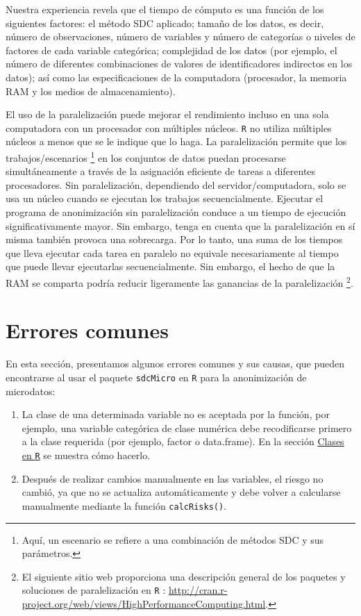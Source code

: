 \documentclass[]{book}
\theoremstyle{definition}
\theoremstyle{definition}
\theoremstyle{definition}
\theoremstyle{definition}
\theoremstyle{remark}
\begin{document}
Nuestra experiencia revela que el tiempo de cómputo es una función de los siguientes factores: el método SDC aplicado; tamaño de los datos, es decir, número de observaciones, número de variables y número de categorías o niveles de factores de cada variable categórica; complejidad de los datos (por ejemplo, el número de diferentes combinaciones de valores de identificadores indirectos en los datos); así como las especificaciones de la computadora (procesador, la memoria RAM y los medios de almacenamiento).

El uso de la paralelización puede mejorar el rendimiento incluso en una sola computadora con un procesador con múltiples núcleos. \texttt{R} no utiliza múltiples núcleos a menos que se le indique que lo haga. La paralelización permite que los trabajos/escenarios \footnote{Aquí, un escenario se refiere a una combinación de métodos SDC y sus parámetros.} en los conjuntos de datos puedan procesarse simultáneamente a través de la asignación eficiente de tareas a diferentes procesadores. Sin paralelización, dependiendo del servidor/computadora, solo se usa un núcleo cuando se ejecutan los trabajos secuencialmente. Ejecutar el programa de anonimización sin paralelización conduce a un tiempo de ejecución significativamente mayor. Sin embargo, tenga en cuenta que la paralelización en sí misma también provoca una sobrecarga. Por lo tanto, una suma de los tiempos que lleva ejecutar cada tarea en paralelo no equivale necesariamente al tiempo que puede llevar ejecutarlas secuencialmente. Sin embargo, el hecho de que la RAM se comparta podría reducir ligeramente las ganancias de la paralelización \footnote{El siguiente sitio web proporciona una descripción general de los paquetes y soluciones de paralelización en \texttt{R} : \url{http://cran.r-project.org/web/views/HighPerformanceComputing.html}. }.

\hypertarget{errores-comunes}{%
\section{Errores comunes}\label{errores-comunes}}

En esta sección, presentamos algunos errores comunes y sus causas, que pueden encontrarse al usar el paquete \texttt{sdcMicro} en \texttt{R} para la anonimización de microdatos:

\begin{enumerate}
\def\labelenumi{\arabic{enumi}.}
\item
  La clase de una determinada variable no es aceptada por la función, por ejemplo, una variable categórica de clase numérica debe recodificarse primero a la clase requerida (por ejemplo, factor o data.frame). En la sección \protect\hyperlink{clases-en-r}{Clases en \texttt{R}} se muestra cómo hacerlo.
\item
  Después de realizar cambios manualmente en las variables, el riesgo no cambió, ya que no se actualiza automáticamente y debe volver a calcularse manualmente mediante la función \texttt{calcRisks()}.
\end{enumerate}
\end{document}
